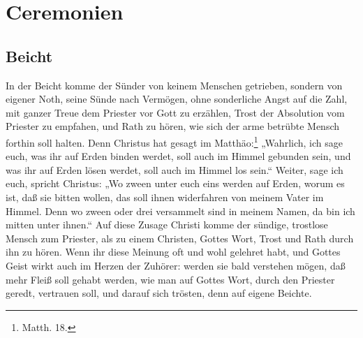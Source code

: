 \section{Ceremonien}

\subsection{Beicht}

In der Beicht komme der Sünder von keinem Menschen getrieben, sondern von eigener Noth, seine Sünde nach Vermögen, ohne sonderliche Angst auf die Zahl, mit ganzer Treue dem Priester vor Gott zu erzählen, Trost der Absolution vom Priester zu empfahen, und Rath zu hören, wie sich der arme betrübte Mensch forthin soll halten. Denn Christus hat gesagt im Matthäo:\footnote{Matth. 18.} „Wahrlich, ich sage euch, was ihr auf Erden binden werdet, soll auch im Himmel gebunden sein, und was ihr auf Erden lösen werdet, soll auch im Himmel los sein.“ Weiter, sage ich euch, spricht Christus: „Wo zween unter euch eins werden auf Erden, worum es ist, daß sie bitten wollen, das soll ihnen widerfahren von meinem Vater im Himmel. Denn wo zween oder drei versammelt sind in meinem Namen, da bin ich mitten unter ihnen.“ Auf diese Zusage Christi komme der sündige, trostlose Mensch zum Priester, als zu einem Christen, Gottes Wort, Trost und Rath durch ihn zu hören. Wenn ihr diese Meinung oft und wohl gelehret habt, und Gottes Geist wirkt auch im Herzen der Zuhörer: werden
sie bald verstehen mögen, daß mehr Fleiß soll gehabt werden, wie man auf Gottes Wort, durch den Priester geredt, vertrauen soll, und darauf sich trösten, denn auf eigene Beichte.

